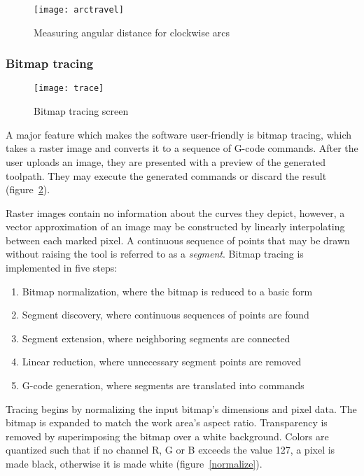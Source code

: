 \begin{figure}[ht]
    \begin{center}
        \texttt{[image: arctravel]}
        \caption{Measuring angular distance for clockwise arcs}
        \label{arctravel}
    \end{center}
\end{figure}

\clearpage
\subsubsection{Bitmap tracing}

\begin{figure}[ht]
    \begin{center}
        \texttt{[image: trace]}
        \caption{Bitmap tracing screen}
        \label{trace}
    \end{center}
\end{figure}

A major feature which makes the software user-friendly is bitmap tracing,
which takes a raster image and converts it to a sequence of G-code commands.
After the user uploads an image, they are presented with a preview of the
generated toolpath. They may execute the generated commands or discard the
result (figure~\ref{trace}).

Raster images contain no information about the curves they depict, however, a
vector approximation of an image may be constructed by linearly interpolating
between each marked pixel. A continuous sequence of points that may be drawn
without raising the tool is referred to as a \textit{segment}. Bitmap tracing
is implemented in five steps:
\begin{enumerate}
    \item Bitmap normalization, where the bitmap is reduced to a basic form
    \item Segment discovery, where continuous sequences of points are found
    \item Segment extension, where neighboring segments are connected
    \item Linear reduction, where unnecessary segment points are removed
    \item G-code generation, where segments are translated into commands
\end{enumerate}

Tracing begins by normalizing the input bitmap's dimensions and pixel data. The
bitmap is expanded to match the work area's aspect ratio. Transparency is
removed by superimposing the bitmap over a white background. Colors are
quantized such that if no channel R, G or B exceeds the value 127, a pixel
is made black, otherwise it is made white (figure~\ref{normalize}).

